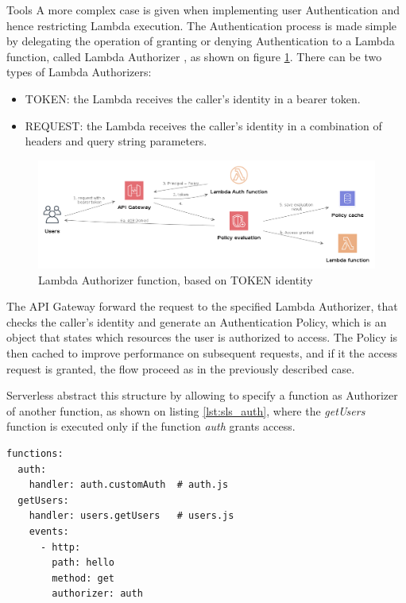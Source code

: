 \begin{chapter}{Tools}
    A more complex case is given when implementing user Authentication and hence
    restricting Lambda execution. The Authentication process is made simple by
    delegating the operation of granting or denying Authentication to a Lambda
    function, called Lambda Authorizer \cite{aws_api_gateway_doc}, as shown on
    figure \ref{fig:lambda_with_auth}. There can be two types of Lambda Authorizers:
    \begin{itemize}
        \item TOKEN: the Lambda receives the caller's identity in a bearer token.
        \item REQUEST: the Lambda receives the caller's identity in a combination
            of headers and query string parameters.
    \end{itemize}

    \begin{figure}
        \centering
        \includegraphics[width=\linewidth]{source/diagrams/lambda_authorizer.png}
        \caption{Lambda Authorizer function, based on TOKEN identity}
        \label{fig:lambda_with_auth}
    \end{figure}

    The API Gateway forward the request to the specified Lambda Authorizer, that
    checks the caller's identity and generate an Authentication Policy, which is
    an object that states which resources the user is authorized to access.
    The Policy is then cached to improve performance on subsequent requests, and
    if it the access request is granted, the flow proceed as in the previously
    described case.

    Serverless abstract this structure by allowing to specify a function as
    Authorizer of another function, as shown on listing \ref{lst:sls_auth}, where
    the \textit{getUsers} function is executed only if the function \textit{auth}
    grants access.

    \bigskip
    \begin{lstlisting}[caption=Authorizer definition on Serverless, label={lst:sls_auth}]
functions:
  auth:
    handler: auth.customAuth  # auth.js
  getUsers:
    handler: users.getUsers   # users.js
    events:
      - http:
        path: hello
        method: get
        authorizer: auth
    \end{lstlisting}


\end{chapter}
